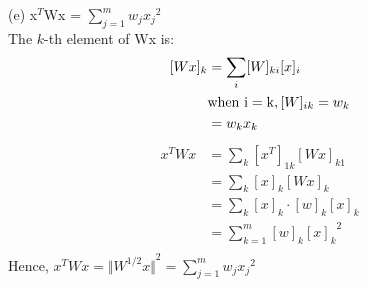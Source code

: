 \documentclass{article}
\begin{document}
\noindent
(e) x$^T$Wx = $\sum\limits_{j=1}^m w_j{x_j}^2$\\
The $k$-th element of Wx is:\\
\begin{equation}
    \begin{aligned}
        [Wx]_{k} & = \sum\limits_{i} [W]_{ki}[x]_{i}\\
        & {\rm when\ i = k}, [W]_{ik} = w_k\\
        & = w_kx_k
    \end{aligned}
\end{equation}
\begin{equation}
    \begin{aligned}
        x^TWx & = \sum\limits_{k} [x^T]_{1k}[Wx]_{k1}\\
        & = \sum\limits_{k} [x]_{k}[Wx]_{k}\\
        & = \sum\limits_{k} [x]_{k}\cdot[w]_{k}[x]_{k}\\
        & = \sum\limits_{k=1}^m [w]_{k}{[x]_{k}}^2\\
    \end{aligned}
\end{equation}
Hence, $x^TWx = {\Vert W^{1/2}x \Vert}^2 = \sum\limits_{j=1}^mw_j{x_j}^2$ 
\end{document}
